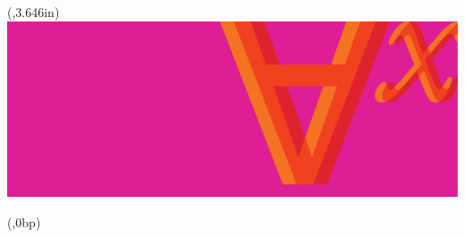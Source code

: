 \documentclass{memoir}
\newlength{\coverheight}
\newlength{\coverwidth}
\newlength{\spinewidth}
\newlength{\spinepos} %
\newlength{\coverartpos}
\begin{document}
\sffamily

\pagestyle{empty}

\begin{textblock*}{\coverwidth}(\coverartpos,3.646in)
  \noindent\includegraphics{assets/forallx-coverart-full.pdf}
\end{textblock*}

\begin{textblock*}{\spinewidth}(\spinepos,0bp)%
  \noindent\hfil
  \hfil
\end{textblock*}
\newbox\adjust
\end{document}

